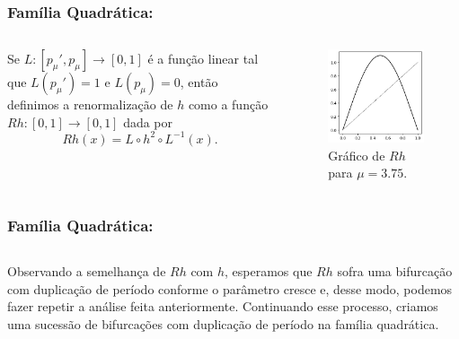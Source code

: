 
\begin{frame}
\vspace{5pt}
\frametitle{Família Quadrática: \subsecname}
\begin{columns}
\column{\dimexpr\paperwidth-15pt}

Se $L: [p_\mu', p_\mu] \to [0, 1]$ é a função linear tal que $L(p_\mu') = 1$ e $L(p_\mu) = 0$, então definimos a renormalização de $h$ como a função $Rh: [0, 1] \to [0, 1]$ dada por
$$Rh(x) = L \circ h^2 \circ L^{-1}(x).$$

\begin{figure}[!htb]
\centering
\includegraphics[scale=0.4]{images/renormalization.png}
\caption{Gráfico de $Rh$ para $\mu = 3.75$.}
\label{renormalization}
\end{figure}

\end{columns}
\end{frame}


\begin{frame}
\vspace{5pt}
\frametitle{Família Quadrática: \subsecname}
\begin{columns}
\column{\dimexpr\paperwidth-15pt}

Observando a semelhança de $Rh$ com $h$, esperamos que $Rh$ sofra uma bifurcação com duplicação de período conforme o parâmetro cresce e, desse modo, podemos fazer repetir a análise feita anteriormente. Continuando esse processo, criamos uma sucessão de bifurcações com duplicação de período na família quadrática.

\end{columns}
\end{frame}

